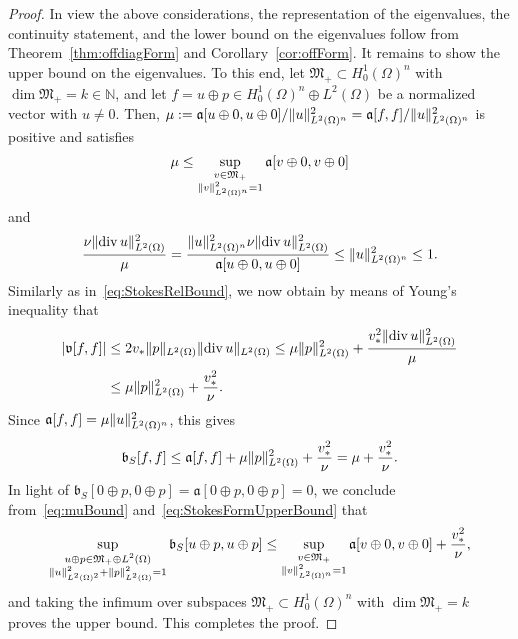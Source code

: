 \documentclass[11pt,a4paper]{amsart}
\numberwithin{equation}{section}
\DeclareMathOperator{\divgc}{div}
\DeclarePairedDelimiter{\abs}{|}{|}
\DeclarePairedDelimiter{\norm}{\lVert}{\rVert}
\newcommand{\NN}{\mathbb{N}}
\newcommand{\fa}{{\mathfrak a}}
\newcommand{\fb}{{\mathfrak b}}
\newcommand{\fv}{{\mathfrak v}}
\newcommand{\fM}{{\mathfrak M}}
\theoremstyle{plain}
\theoremstyle{definition}
\theoremstyle{remark}
\begin{document}
\begin{proof}
  In view the above considerations, the representation of the eigenvalues, the continuity statement, and the lower bound on the
  eigenvalues follow from Theorem~\ref{thm:offdiagForm} and Corollary~\ref{cor:offForm}. It remains to show the upper bound on
  the eigenvalues. To this end, let $\fM_+ \subset H_0^1(\Omega)^n$ with $\dim \fM_+ = k \in \NN$, and let
  $f = u \oplus p \in H_0^1(\Omega)^n \oplus L^2(\Omega)$ be a normalized vector with $u \neq 0$. Then,
  $\mu := \fa[ u \oplus 0 , u \oplus 0 ] / \norm{u}_{L^2(\Omega)^n}^2 = \fa[ f , f ] / \norm{u}_{L^2(\Omega)^n}^2$ is positive
  and satisfies
  \begin{equation}\label{eq:muBound}
    \mu
    \le
    \sup_{\substack{v \in \fM_+\\ \norm{v}_{L^2(\Omega)^n}^2 = 1}} \fa[ v \oplus 0 , v \oplus 0 ]
  \end{equation}
  and
  \begin{equation*}
    \frac{\nu\norm{\divgc u}_{L^2(\Omega)}^2}{\mu}
    =
    \frac{\norm{u}_{L^2(\Omega)^n}^2 \nu \norm{\divgc u}_{L^2(\Omega)}^2}{\fa[ u \oplus 0 , u \oplus 0 ]}
    \le
    \norm{u}_{L^2(\Omega)^n}^2
    \le
    1
    .
  \end{equation*}
  Similarly as in~\eqref{eq:StokesRelBound}, we now obtain by means of Young's inequality that
  \begin{align*}
    \abs{ \fv[ f , f ] }
    &\le
    2v_*\norm{p}_{L^2(\Omega)} \norm{\divgc u}_{L^2(\Omega)}
      \le
      \mu \norm{p}_{L^2(\Omega)}^2 + \frac{v_*^2 \norm{\divgc u}_{L^2(\Omega)}^2}{\mu}\\
    &\le
    \mu \norm{p}_{L^2(\Omega)}^2 + \frac{v_*^2}{\nu}
    .
  \end{align*}
  Since $\fa[ f , f ] = \mu\norm{u}_{L^2(\Omega)^n}^2$, this gives
  \begin{equation}\label{eq:StokesFormUpperBound}
    \fb_S[ f , f ]
    \le
    \fa[ f , f ] + \mu \norm{p}_{L^2(\Omega)}^2 + \frac{v_*^2}{\nu}
    =
    \mu + \frac{v_*^2}{\nu}
    .
  \end{equation}
  In light of $\fb_S[ 0 \oplus p , 0 \oplus p ] = \fa[ 0 \oplus p , 0 \oplus p ] = 0$, we conclude from~\eqref{eq:muBound}
  and~\eqref{eq:StokesFormUpperBound} that
  \begin{equation*}
    \sup_{\substack{u \oplus p \in \fM_+ \oplus L^2(\Omega)\\ \norm{u}_{L^2(\Omega)^2}^2 + \norm{p}_{L^2(\Omega)}^2 = 1}}
      \fb_S[ u \oplus p , u \oplus p ]
    \le
    \sup_{\substack{v \in \fM_+\\ \norm{v}_{L^2(\Omega)^n}^2 = 1}} \fa[ v \oplus 0 , v \oplus 0 ] + \frac{v_*^2}{\nu}
    ,
  \end{equation*}
  and taking the infimum over subspaces $\fM_+ \subset H_0^1(\Omega)^n$ with $\dim\fM_+ = k$ proves the upper bound. This
  completes the proof.
\end{proof}%
\end{document}
